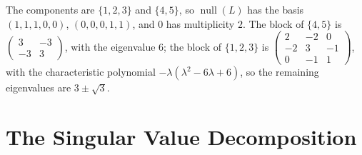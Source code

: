 \documentclass[11pt]{article}
\DeclareMathOperator{\Null}{null}
\begin{document}
\begin{description}[leftmargin=0pt, itemsep=0.3em]
    \item[\ref{pr:laplacian-components}.] The components are $\{1, 2, 3\}$ and $\{4, 5\}$, so $\Null(L)$ has the basis $(1, 1, 1, 0, 0)$, $(0, 0, 0, 1, 1)$, and $0$ has multiplicity $2$. The block of $\{4, 5\}$ is $\begin{pmatrix} 3 & -3 \\ -3 & 3 \end{pmatrix}$, with the eigenvalue $6$; the block of $\{1, 2, 3\}$ is $\begin{pmatrix} 2 & -2 & 0 \\ -2 & 3 & -1 \\ 0 & -1 & 1 \end{pmatrix}$, with the characteristic polynomial $-\lambda(\lambda^2 - 6\lambda + 6)$, so the remaining eigenvalues are $3 \pm \sqrt{3}$.
\end{description}

\section*{The Singular Value Decomposition}
\end{document}
